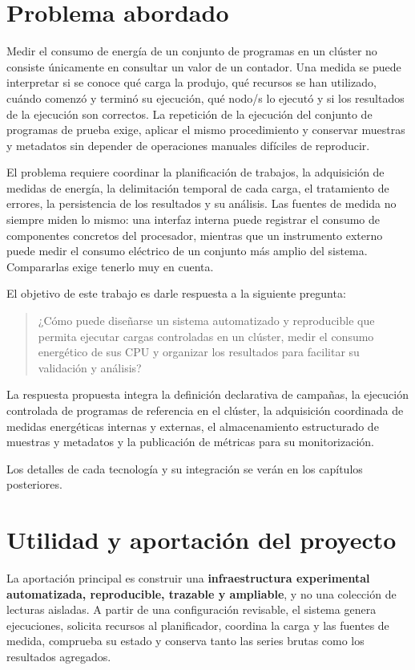 \section{Problema abordado}
\label{sec:introduccion_problema}

Medir el consumo de energía de un conjunto de programas en un clúster no consiste únicamente en consultar un valor de un contador. Una medida se puede interpretar si se conoce qué carga la produjo, qué recursos se han utilizado, cuándo comenzó y terminó su ejecución, qué nodo/s lo ejecutó y si los resultados de la ejecución son correctos. La repetición de la ejecución del conjunto de programas de prueba exige, aplicar el mismo procedimiento y conservar muestras y metadatos sin depender de operaciones manuales difíciles de reproducir.

El problema requiere coordinar la planificación de trabajos, la adquisición de medidas de energía, la delimitación temporal de cada carga, el tratamiento de errores, la persistencia de los resultados y su análisis. Las fuentes de medida no siempre miden lo mismo: una interfaz interna puede registrar el consumo de componentes concretos del procesador, mientras que un instrumento externo puede medir el consumo eléctrico de un conjunto más amplio del sistema. Compararlas exige tenerlo muy en cuenta.

El objetivo de este trabajo es darle respuesta a la siguiente pregunta:
\begin{quote}
¿Cómo puede diseñarse un sistema automatizado y reproducible que permita ejecutar cargas controladas en un clúster, medir el consumo energético de sus CPU y organizar los resultados para facilitar su validación y análisis?
\end{quote}
La respuesta propuesta integra la definición declarativa de campañas, la ejecución controlada de programas de referencia en el clúster, la adquisición coordinada de medidas energéticas internas y externas, el almacenamiento estructurado de muestras y metadatos y la publicación de métricas para su monitorización.

Los detalles de cada tecnología y su integración se verán en los capítulos posteriores.

\section{Utilidad y aportación del proyecto}
\label{sec:introduccion_utilidad}

La aportación principal es construir una \textbf{infraestructura experimental automatizada, reproducible, trazable y ampliable}, y no una colección de lecturas aisladas. A partir de una configuración revisable, el sistema genera ejecuciones, solicita recursos al planificador, coordina la carga y las fuentes de medida, comprueba su estado y conserva tanto las series brutas como los resultados agregados.

